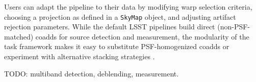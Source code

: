 Users can adapt the pipeline to their data by modifying warp selection criteria, choosing a projection as defined in a \texttt{SkyMap} object, and adjusting artifact rejection parameters.
While the default LSST pipelines build direct (non-PSF-matched) coadds for source detection and measurement, the modularity of the task framework makes it easy to substitute PSF-homogenized coadds or experiment with alternative stacking strategies \citep{DMTN-015}.

TODO: multiband detection, deblending, measurement.